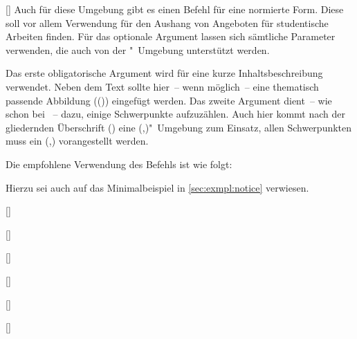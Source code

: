 \begin{Entity*}{}
\begin{Declaration}{%
  [\OList{}]%
}
\printdeclarationlist%
%
Auch für diese Umgebung gibt es einen Befehl für eine normierte Form. Diese 
soll vor allem Verwendung für den Aushang von Angeboten für studentische 
Arbeiten finden. Für das optionale Argument lassen sich sämtliche Parameter 
verwenden, die auch von der "~Umgebung unterstützt werden.

Das erste obligatorische Argument wird für eine kurze Inhaltsbeschreibung 
verwendet. Neben dem Text sollte hier~--  wenn möglich~--  eine thematisch 
passende Abbildung (()) eingefügt 
werden. Das zweite Argument dient~-- wie schon bei ~-- dazu, 
einige Schwerpunkte aufzuzählen. Auch hier kommt nach der gliedernden 
Überschrift () eine 
(,)"~Umgebung zum 
Einsatz, allen Schwerpunkten muss ein 
(,) vorangestellt werden.
\end{Declaration}
%
\begin{Example}
Die empfohlene Verwendung des Befehls  ist wie folgt:
\begin{Code}[escapechar=§]
}{%
  \item Schwerpunkt 1
  \item Schwerpunkt 2
  \item Schwerpunkt 3
}
\end{Code}
Hierzu sei auch auf das Minimalbeispiel in \autoref{sec:exmpl:notice} 
verwiesen.%
%
\end{Example}

\begin{Declaration}[v2.02]{[]}
\begin{Declaration'}{%
  []%
}
\begin{Declaration'}{[]}
\begin{Declaration}[v2.02]{[]}
\begin{Declaration}[v2.05]{[]}
\begin{Declaration}{[]}


\end{Declaration}
\end{Declaration}
\end{Declaration}
\end{Declaration'}
\end{Declaration'}
\end{Declaration}
\end{Entity*}
